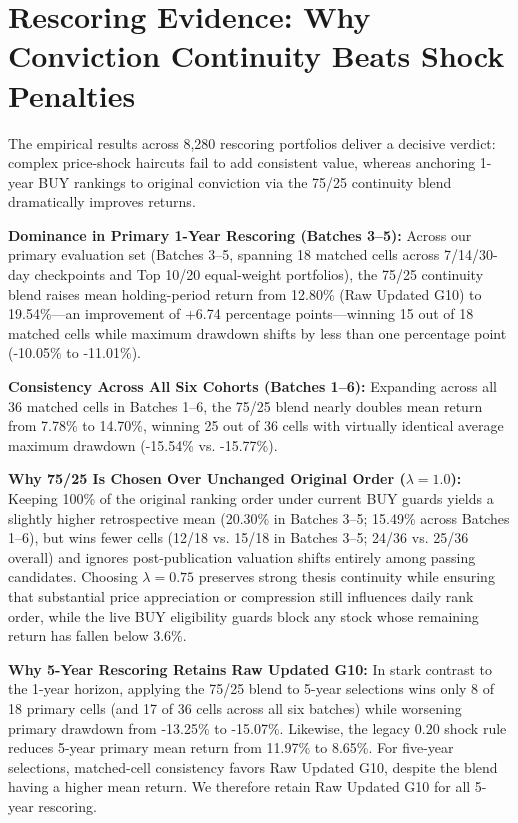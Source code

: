 \documentclass[11pt,a4paper]{article}
\numberwithin{table}{section}
\begin{document}
\section{Rescoring Evidence: Why Conviction Continuity Beats Shock Penalties}

The empirical results across 8,280 rescoring portfolios deliver a decisive verdict: complex price-shock haircuts fail to add consistent value, whereas anchoring 1-year BUY rankings to original conviction via the 75/25 continuity blend dramatically improves returns.

\textbf{Dominance in Primary 1-Year Rescoring (Batches 3--5):}  Across our primary evaluation set (Batches 3--5, spanning 18 matched cells across 7/14/30-day checkpoints and Top 10/20 equal-weight portfolios), the 75/25 continuity blend raises mean holding-period return from 12.80\% (Raw Updated G10) to 19.54\%---an improvement of +6.74 percentage points---winning 15 out of 18 matched cells while maximum drawdown shifts by less than one percentage point (-10.05\% to -11.01\%).

\textbf{Consistency Across All Six Cohorts (Batches 1--6):}  Expanding across all 36 matched cells in Batches 1--6, the 75/25 blend nearly doubles mean return from 7.78\% to 14.70\%, winning 25 out of 36 cells with virtually identical average maximum drawdown (-15.54\% vs. -15.77\%).

\textbf{Why 75/25 Is Chosen Over Unchanged Original Order ($\lambda = 1.0$):}  Keeping 100\% of the original ranking order under current BUY guards yields a slightly higher retrospective mean (20.30\% in Batches 3--5; 15.49\% across Batches 1--6), but wins fewer cells (12/18 vs. 15/18 in Batches 3--5; 24/36 vs. 25/36 overall) and ignores post-publication valuation shifts entirely among passing candidates. Choosing $\lambda = 0.75$ preserves strong thesis continuity while ensuring that substantial price appreciation or compression still influences daily rank order, while the live BUY eligibility guards block any stock whose remaining return has fallen below 3.6\%.

\textbf{Why 5-Year Rescoring Retains Raw Updated G10:}  In stark contrast to the 1-year horizon, applying the 75/25 blend to 5-year selections wins only 8 of 18 primary cells (and 17 of 36 cells across all six batches) while worsening primary drawdown from -13.25\% to -15.07\%. Likewise, the legacy 0.20 shock rule reduces 5-year primary mean return from 11.97\% to 8.65\%. For five-year selections, matched-cell consistency favors Raw Updated G10, despite the blend having a higher mean return. We therefore retain Raw Updated G10 for all 5-year rescoring.
\end{document}
